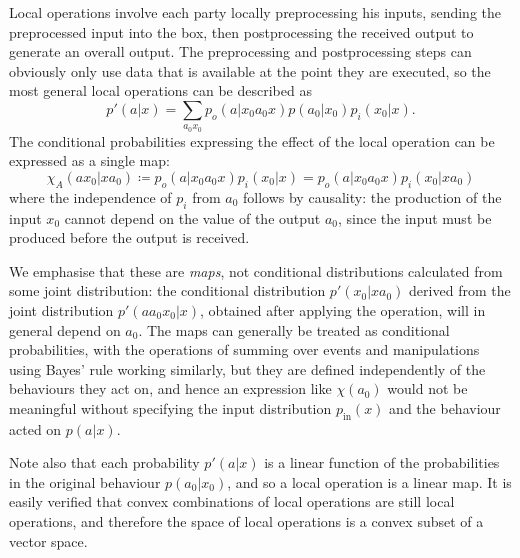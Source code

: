 \documentclass[10pt, a4paper]{article}
\numberwithin{equation}{section} %
\theoremstyle{definition}
\theoremstyle{plain}
\newcommand{\?}{\mathrel{?}} %
\newcommand{\prin}[1][p]{#1_{\mathrm{in}}}
\begin{document}
              Local operations involve each party locally preprocessing his inputs, sending the preprocessed input into the box, then postprocessing the received output to generate an overall output. The preprocessing and postprocessing steps can obviously only use data that is available at the point they are executed, so the most general local operations can be described as~\cite[Def. 4]{LocalTransformations}
              \begin{equation}
                p'(a|x) = \sum_{a_0 x_0} p_o(a|x_0 a_0 x) p(a_0|x_0) p_i(x_0|x).
              \end{equation}
              The conditional probabilities expressing the effect of the local operation can be expressed as a single map:
              \begin{equation}\label{eqn:opmap}
                \chi_A(a x_0 | x a_0) \coloneqq p_o(a|x_0a_0x) p_i(x_0|x) = p_o(a|x_0a_0x) p_i(x_0|x a_0)
              \end{equation}
              where the independence of \(p_i\) from \(a_0\) follows by causality: the production of the input \(x_0\) cannot depend on the value of the output \(a_0\), since the input must be produced before the output is received.

              We emphasise that these are \emph{maps}, not conditional distributions calculated from some joint distribution: the conditional distribution \(p'(x_0|x a_0)\) derived from the joint distribution \(p'(a a_0 x_0|x)\), obtained after applying the operation, will in general depend on \(a_0\). The maps can generally be treated as conditional probabilities, with the operations of summing over events and manipulations using Bayes' rule working similarly, but they are defined independently of the behaviours they act on, and hence an expression like \(\chi(a_0)\) would not be meaningful without specifying the input distribution \(\prin(x)\) and the behaviour acted on \(p(a|x)\).

              Note also that each probability \(p'(a|x)\) is a linear function of the probabilities in the original behaviour \(p(a_0|x_0)\), and so a local operation is a linear map. It is easily verified that convex combinations of local operations are still local operations, and therefore the space of local operations is a convex subset of a vector space.
\end{document}
